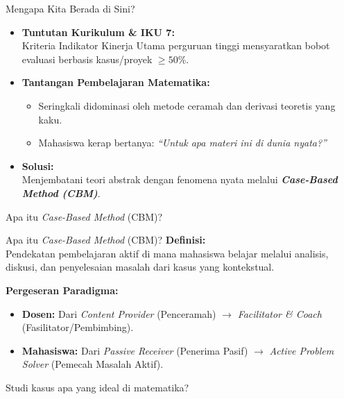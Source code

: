 \documentclass[aspectratio=169]{beamer} %
\begin{document}
\begin{frame}{Mengapa Kita Berada di Sini?}
    \begin{itemize}
        \item \textbf{Tuntutan Kurikulum \& IKU 7:}\\
        Kriteria Indikator Kinerja Utama perguruan tinggi mensyaratkan bobot evaluasi berbasis kasus/proyek $\ge 50\%$.
        \vspace{0.3cm}
        \item \textbf{Tantangan Pembelajaran Matematika:}
        \begin{itemize}
            \item Seringkali didominasi oleh metode ceramah dan derivasi teoretis yang kaku.
            \item Mahasiswa kerap bertanya: \textit{``Untuk apa materi ini di dunia nyata?''}
        \end{itemize}
        \vspace{0.3cm}
        \item \textbf{Solusi:}\\
        Menjembatani teori abstrak dengan fenomena nyata melalui \textbf{\textit{Case-Based Method (CBM)}}.
    \end{itemize}

\vspace{0.3cm}
Apa itu \textit{Case-Based Method} (CBM)?
	
\end{frame}

\begin{frame}{Apa itu \textit{Case-Based Method} (CBM)?}
    \textbf{Definisi:}\\
    Pendekatan pembelajaran aktif di mana mahasiswa belajar melalui analisis, diskusi, dan penyelesaian masalah dari kasus yang kontekstual.
    
    \vspace{0.5cm}
    \textbf{Pergeseran Paradigma:}
    \begin{itemize}
        \item \textbf{Dosen:} Dari \textit{Content Provider} (Penceramah) $\rightarrow$ \textit{Facilitator \& Coach} (Fasilitator/Pembimbing).
        \item \textbf{Mahasiswa:} Dari \textit{Passive Receiver} (Penerima Pasif) $\rightarrow$ \textit{Active Problem Solver} (Pemecah Masalah Aktif).
    \end{itemize}

\vspace{0.5cm}
Studi kasus apa yang ideal di matematika?
	
\end{frame}
\end{document}
